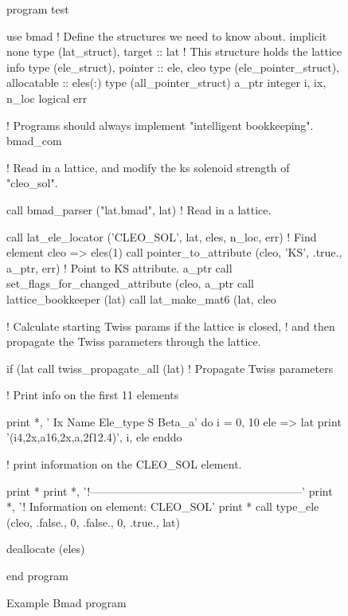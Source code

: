 \begin{figure}[htp]
\begin{listing}{1}
program test

use bmad                 ! Define the structures we need to know about.
implicit none
type (lat_struct), target :: lat   ! This structure holds the lattice info
type (ele_struct), pointer :: ele, cleo
type (ele_pointer_struct), allocatable :: eles(:)
type (all_pointer_struct) a_ptr
integer i, ix, n_loc
logical err

! Programs should always implement "intelligent bookkeeping".
bmad_com%

! Read in a lattice, and modify the ks solenoid strength of "cleo_sol".

call bmad_parser ("lat.bmad", lat)  ! Read in a lattice.

call lat_ele_locator ('CLEO_SOL', lat, eles, n_loc, err)  ! Find element
cleo => eles(1)%
call pointer_to_attribute (cleo, 'KS', .true., a_ptr, err) ! Point to KS attribute.
a_ptr%
call set_flags_for_changed_attribute (cleo, a_ptr%
call lattice_bookkeeper (lat)
call lat_make_mat6 (lat, cleo%

! Calculate starting Twiss params if the lattice is closed, 
! and then propagate the Twiss parameters through the lattice.

if (lat%
call twiss_propagate_all (lat)      ! Propagate Twiss parameters

! Print info on the first 11 elements

print *, ' Ix  Name              Ele_type                   S      Beta_a'
do i = 0, 10
  ele => lat%
  print '(i4,2x,a16,2x,a,2f12.4)', i, ele%
enddo

! print information on the CLEO_SOL element.

print *
print *, '!---------------------------------------------------------'
print *, '! Information on element: CLEO_SOL'
print *
call type_ele (cleo, .false., 0, .false., 0, .true., lat)

deallocate (eles)

end program
\end{listing}
\caption{Example Bmad program}
\label{f:program}
\end{figure}

